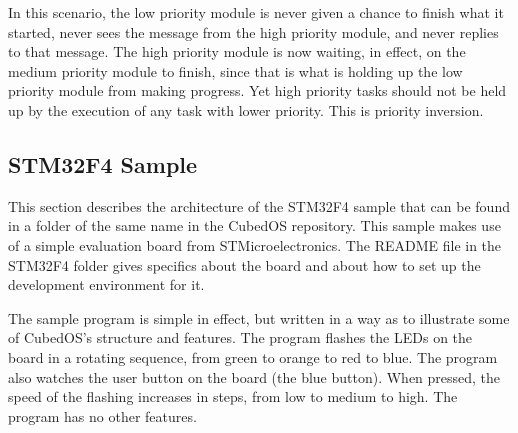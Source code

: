 In this scenario, the low priority module is never given a chance to finish what it started,
never sees the message from the high priority module, and never replies to that message. The
high priority module is now waiting, in effect, on the medium priority module to finish, since
that is what is holding up the low priority module from making progress. Yet high priority tasks
should not be held up by the execution of any task with lower priority. This is priority
inversion.



\subsection{STM32F4 Sample}
\label{sec:manual-stm32f4-sample}

This section describes the architecture of the STM32F4 sample that can be found in a folder of
the same name in the CubedOS repository. This sample makes use of a simple evaluation board from
STMicroelectronics. The README file in the STM32F4 folder gives specifics about the board and
about how to set up the development environment for it.

The sample program is simple in effect, but written in a way as to illustrate some of CubedOS's
structure and features. The program flashes the LEDs on the board in a rotating sequence, from
green to orange to red to blue. The program also watches the user button on the board (the blue
button). When pressed, the speed of the flashing increases in steps, from low to medium to high.
The program has no other features.

